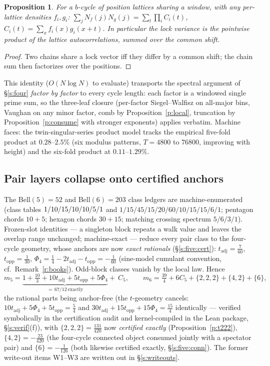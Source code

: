 \documentclass[11pt]{article}
\numberwithin{equation}{section}
\newtheorem{proposition}[theorem]{Proposition}
\theoremstyle{definition}
\theoremstyle{remark}
\begin{document}
\begin{proposition}\label{p:prod}
For a $b$-cycle of position lattices sharing a window, with any
per-lattice densities $f_i,g_i$:
$\sum_jN_f(j)N_g(j)=\sum_t\prod_iC_i(t)$,
$C_i(t)=\sum_xf_i(x)g_i(x+t)$. In particular the lock variance is
the pointwise product of the lattice autocorrelations, summed
over the common shift.
\end{proposition}

\begin{proof}
Two chains share a lock vector iff they differ by a common shift;
the chain sum then factorizes over the positions.
\end{proof}

This identity ($O(N\log N)$ to evaluate) transports the spectral
argument of \S\ref{s:four} \emph{factor by factor} to every cycle
length: each factor is a windowed single prime sum, so the
three-leaf closure (per-factor Siegel--Walfisz on all-major bins,
Vaughan on any minor factor, comb by Proposition~\ref{p:local},
truncation by Proposition~\ref{p:consume} with stronger
exponents) applies verbatim. Machine faces: the
twin-singular-series product model tracks the empirical five-fold
product at $0.28$--$2.5\%$ (six modulus patterns, $T=4800$ to
$76800$, improving with height) and the six-fold product at
$0.11$--$1.29\%$.

\subsection{Pair layers collapse onto certified anchors}

The Bell$(5)=52$ and Bell$(6)=203$ class ledgers are
machine-enumerated (class tables $1/10/15 \\
/10/10/5/1$ and
$1/15/45/15/20/60/10/15/15/6/1$; pentagon chords $10+5$; hexagon
chords $30+15$; matching crossing spectrum $5/6/3/1$).
Frozen-slot identities --- a singleton block repeats a walk value
and leaves the overlap range unchanged; machine-exact --- reduce
every pair class to the four-cycle geometry, whose anchors are
now \emph{exact rationals} (\S\ref{s:five:cert}):
$t_{\mathrm{adj}}=\tfrac7{60}$, $t_{\mathrm{opp}}=\tfrac1{30}$,
$\Phi_4=\tfrac14-2t_{\mathrm{adj}}-t_{\mathrm{opp}}=-\tfrac1{60}$
(sine-model cumulant convention, cf.\ Remark~\ref{r:books}).
Odd-block classes vanish by the local law. Hence
\[
m_5=\underbrace{1+\tfrac{10}3+10t_{\mathrm{adj}}
+5t_{\mathrm{opp}}+5\Phi_4}_{=\,67/12\ \text{exactly}}+\ C_5,
\qquad
m_6=\tfrac{39}4+6C_5+\{2,2,2\}+\{4,2\}+\{6\},
\]
the rational parts being anchor-free (the $t$-geometry cancels:
$10t_{\mathrm{adj}}+5\Phi_4+5t_{\mathrm{opp}}=\tfrac54$ and
$30t_{\mathrm{adj}}+15t_{\mathrm{opp}}+15\Phi_4=\tfrac{15}4$
identically --- verified symbolically in the certification
audit and kernel-compiled in the Lean package,
\S\ref{s:verif}(f)), with $\{2,2,2\}=\tfrac{131}{420}$ now
\emph{certified exactly} (Proposition~\ref{p:t222}),
$\{4,2\}=-\tfrac{23}{420}$ (the four-cycle connected object
consumed jointly with a spectator pair) and
$\{6\}=-\tfrac1{126}$ (both likewise certified exactly,
\S\ref{s:five:conn}). The former write-out items W1--W3
are written out in \S\ref{s:writeouts}.
\end{document}
